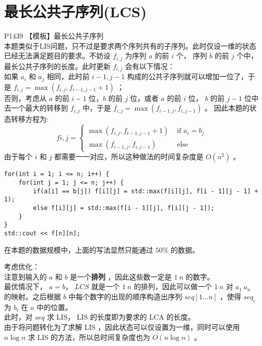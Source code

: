 \documentclass{beamer}
\newcommand{\fdf}[1]{\alert{\textbf{#1}}}
\begin{document}
\section{最长公共子序列(LCS)}
\begin{frame}
P1439 【模板】最长公共子序列\\ 
本题类似于LIS问题，只不过是要求两个序列共有的子序列。此时仅设一维的状态已经无法满足题目的要求。不妨设 $f_{i, j}$ 为序列 $a$ 的前 $i$ 个， 序列 $b$ 的前 $j$ 个中，最长公共子序列的长度。此时更新 $f_{i, j}$ 会有以下情况：\\
如果 $a_i$ 和 $a_j$ 相同，此时前 $i - 1, j - 1$ 构成的公共子序列就可以增加一位了，于是 $f_{i, j} = \max(f_{i, j}, f_{i - 1, j - 1} + 1)$ ； \\ 
否则，考虑从 $a$ 的前 $i - 1$ 位，$b$ 的前 $j$ 位，或者 $a$ 的前 $i$ 位， $b$ 的前 $j - 1$ 位中去一个最大的转移到 $f_{i, j}$ 中，于是 $f_{i, j} = \max(f_{i - 1, j}, f_{i, j - 1})$ 。
因此本题的状态转移方程为:
$$f{i, j} = \left\{\begin{matrix}
	\max(f_{i, j}, f_{i - 1, j - 1} + 1) & \text { if } a_i = b_j\\ 
	\max(f_{i - 1, j}, f_{i, j - 1}) & \text { else }
\end{matrix}\right.$$
由于每个 $i$ 和 $j$ 都需要一一对应，所以这种做法的时间复杂度是 $O(n^2)$ 。
\end{frame}
\begin{frame}[fragile]
\begin{onlyenv}
\begin{verbatim}
for(int i = 1; i <= n; i++) {
    for(int j = 1; j <= n; j++) {
        if(a[i] == b[j]) f[i][j] = std::max(f[i][j], f[i - 1][j - 1] + 1);
        else f[i][j] = std::max(f[i - 1][j], f[i][j - 1]);
    }
}
std::cout << f[n][n];
\end{verbatim}
\end{onlyenv}
在本题的数据规模中，上面的写法显然只能通过 $50\%$ 的数据。
\end{frame}
\begin{frame}
考虑优化： \\ 
注意到输入的 $a$ 和 $b$ 是一个\fdf{排列} ，因此这些数一定是 $1 ~ n$ 的数字。\\
最优情况下， $a = b$， $LCS$ 就是一个 $1 ~ n$ 的排列，因此可以做一个 $1 ~ n$ 对 $a_1 ~ a_n$ 的映射。之后根据 $b$ 中每个数字的出现的顺序构造出序列 $seq[1...n]$ ，使得 $seq_i$ 为 $b_i$ 在 $a$ 中的位置。 \\ 
此时，对 $seq$ 求 LIS， LIS 的长度即为要求的 LCA 的长度。 \\ 
由于将问题转化为了求解 LIS ，因此状态可以仅设置为一维，同时可以使用 $n \log n$ 求 LIS 的方法，所以总时间复杂度也为 $O(n \log n)$ 。
\end{frame}
\end{document}
